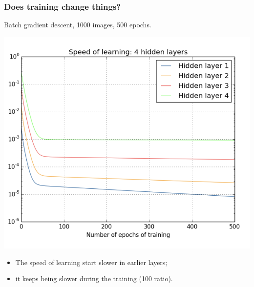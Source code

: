 \documentclass[usenames,dvipsnames]{beamer}
\begin{document}
\begin{frame}
\frametitle{Does training change things?}

Batch gradient descent, 1000 images, 500 epochs.

\centering
	\includegraphics[scale=.3]{speed-graph}
	
\flushleft
\begin{itemize}
  \item The speed of learning start slower in earlier layers;
  \item it keeps being slower during the training (100 ratio).
\end{itemize}
	
\end{frame}
\end{document}
